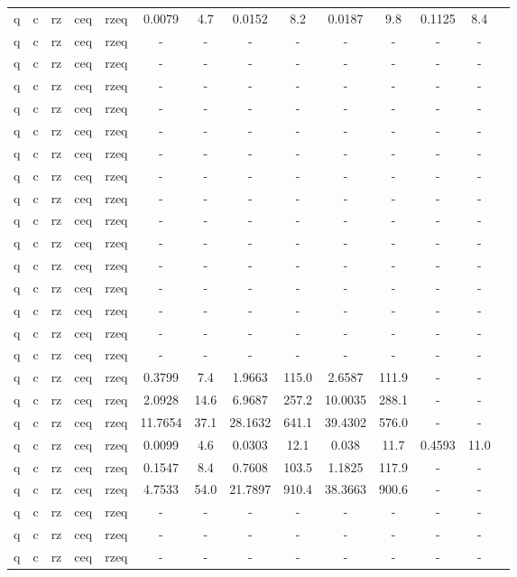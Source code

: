 \begin{table}[htb]
{\begin{tabular}{|c|c|c|c|c|c|c|c|c|c|c|c|c|c|}
q & c & rz & ceq & rzeq & 0.0079 & 4.7 & 0.0152 & 8.2 & 0.0187 & 9.8 & 0.1125 & 8.4 \\ 
q & c & rz & ceq & rzeq & - & - & - & - & - & - & - & - \\ 
q & c & rz & ceq & rzeq & - & - & - & - & - & - & - & - \\ 
q & c & rz & ceq & rzeq & - & - & - & - & - & - & - & - \\ 
q & c & rz & ceq & rzeq & - & - & - & - & - & - & - & - \\ 
q & c & rz & ceq & rzeq & - & - & - & - & - & - & - & - \\ 
q & c & rz & ceq & rzeq & - & - & - & - & - & - & - & - \\ 
q & c & rz & ceq & rzeq & - & - & - & - & - & - & - & - \\ 
q & c & rz & ceq & rzeq & - & - & - & - & - & - & - & - \\ 
q & c & rz & ceq & rzeq & - & - & - & - & - & - & - & - \\ 
q & c & rz & ceq & rzeq & - & - & - & - & - & - & - & - \\ 
q & c & rz & ceq & rzeq & - & - & - & - & - & - & - & - \\ 
q & c & rz & ceq & rzeq & - & - & - & - & - & - & - & - \\ 
q & c & rz & ceq & rzeq & - & - & - & - & - & - & - & - \\ 
q & c & rz & ceq & rzeq & - & - & - & - & - & - & - & - \\ 
q & c & rz & ceq & rzeq & - & - & - & - & - & - & - & - \\ 
q & c & rz & ceq & rzeq & 0.3799 & 7.4 & 1.9663 & 115.0 & 2.6587 & 111.9 & - & - \\ 
q & c & rz & ceq & rzeq & 2.0928 & 14.6 & 6.9687 & 257.2 & 10.0035 & 288.1 & - & - \\ 
q & c & rz & ceq & rzeq & 11.7654 & 37.1 & 28.1632 & 641.1 & 39.4302 & 576.0 & - & - \\ 
q & c & rz & ceq & rzeq & 0.0099 & 4.6 & 0.0303 & 12.1 & 0.038 & 11.7 & 0.4593 & 11.0 \\ 
q & c & rz & ceq & rzeq & 0.1547 & 8.4 & 0.7608 & 103.5 & 1.1825 & 117.9 & - & - \\ 
q & c & rz & ceq & rzeq & 4.7533 & 54.0 & 21.7897 & 910.4 & 38.3663 & 900.6 & - & - \\ 
q & c & rz & ceq & rzeq & - & - & - & - & - & - & - & - \\ 
q & c & rz & ceq & rzeq & - & - & - & - & - & - & - & - \\ 
q & c & rz & ceq & rzeq & - & - & - & - & - & - & - & - \\ 

\end{tabular}}
\end{table}
